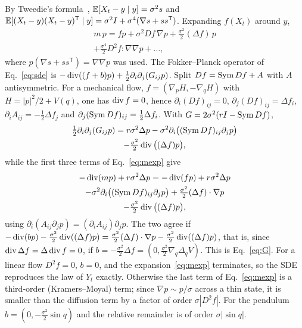 By Tweedie's formula~\cite{efron2011}, $\mathbb{E}[X_t - y\mid y] = \sigma^2 s$ and $\mathbb{E}[(X_t - y)(X_t - y)^{\mathsf T}\mid y] = \sigma^2 I + \sigma^4(\nabla s + ss^{\mathsf T})$. Expanding $f(X_t)$ around $y$,
\begin{multline}
m\,p = f p + \sigma^2 Df\,\nabla p + \tfrac{\sigma^2}{2}(\Delta f)\,p \\
+ \tfrac{\sigma^4}{2}D^2 f : \nabla\nabla p + \dots ,
\label{eq:mexp}
\end{multline}
where $p(\nabla s + ss^{\mathsf T}) = \nabla\nabla p$ was used. The Fokker--Planck operator of Eq.~\eqref{eq:sde} is $-\operatorname{div}((f+b)p) + \tfrac12\partial_i\partial_j(G_{ij}p)$. Split $Df = \operatorname{Sym} Df + A$ with $A$ antisymmetric. For a mechanical flow, $f = (\nabla_p H, -\nabla_q H)$ with $H = |p|^2/2 + V(q)$, one has $\operatorname{div} f = 0$, hence $\partial_i (Df)_{ij} = 0$, $\partial_j (Df)_{ij} = \Delta f_i$, $\partial_i A_{ij} = -\tfrac12\Delta f_j$ and $\partial_j(\operatorname{Sym} Df)_{ij} = \tfrac12\Delta f_i$. With $G = 2\sigma^2(rI - \operatorname{Sym} Df)$,
\begin{multline}
\tfrac12\partial_i\partial_j(G_{ij}p) = r\sigma^2\Delta p - \sigma^2\partial_i\big((\operatorname{Sym} Df)_{ij}\partial_j p\big) \\
 - \tfrac{\sigma^2}{2}\operatorname{div}\big((\Delta f)p\big),
\end{multline}
while the first three terms of Eq.~\eqref{eq:mexp} give
\begin{multline}
-\operatorname{div}(mp) + r\sigma^2\Delta p = -\operatorname{div}(fp) + r\sigma^2\Delta p \\
- \sigma^2\partial_i\big((\operatorname{Sym} Df)_{ij}\partial_j p\big) + \tfrac{\sigma^2}{2}(\Delta f)\cdot\nabla p \\
- \tfrac{\sigma^2}{2}\operatorname{div}\big((\Delta f)p\big) ,
\end{multline}
using $\partial_i(A_{ij}\partial_j p) = (\partial_i A_{ij})\partial_j p$. The two agree if $-\operatorname{div}(bp) - \tfrac{\sigma^2}{2}\operatorname{div}((\Delta f)p) = \tfrac{\sigma^2}{2}(\Delta f)\cdot\nabla p - \tfrac{\sigma^2}{2}\operatorname{div}((\Delta f)p)$, that is, since $\operatorname{div}\Delta f = \Delta\operatorname{div} f = 0$, if $b = -\tfrac{\sigma^2}{2}\Delta f = (0, \tfrac{\sigma^2}{2}\nabla_q\Delta_q V)$. This is Eq.~\eqref{eq:G}. For a linear flow $D^2 f = 0$, $b = 0$, and the expansion~\eqref{eq:mexp} terminates, so the SDE reproduces the law of $Y_t$ exactly. Otherwise the last term of Eq.~\eqref{eq:mexp} is a third-order (Kramers--Moyal) term; since $\nabla p \sim p/\sigma$ across a thin state, it is smaller than the diffusion term by a factor of order $\sigma|D^2 f|$. For the pendulum $b = (0, -\tfrac{\sigma^2}{2}\sin q)$ and the relative remainder is of order $\sigma|\sin q|$.
